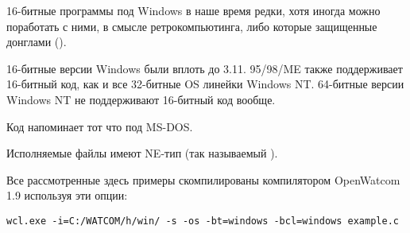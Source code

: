 
16-битные программы под Windows в наше время редки, хотя иногда можно поработать с ними, в смысле ретрокомпьютинга,
либо которые защищенные донглами ().

16-битные версии Windows были вплоть до 3.11.
95/98/ME также поддерживает 16-битный код, как и все 32-битные OS линейки \gls{Windows NT}.
64-битные версии \gls{Windows NT} не поддерживают 16-битный код вообще.

Код напоминает тот что под MS-DOS.

Исполняемые файлы имеют NE-тип (так называемый ).

Все рассмотренные здесь примеры скомпилированы компилятором OpenWatcom 1.9 используя эти опции:

\begin{lstlisting}
wcl.exe -i=C:/WATCOM/h/win/ -s -os -bt=windows -bcl=windows example.c
\end{lstlisting}








